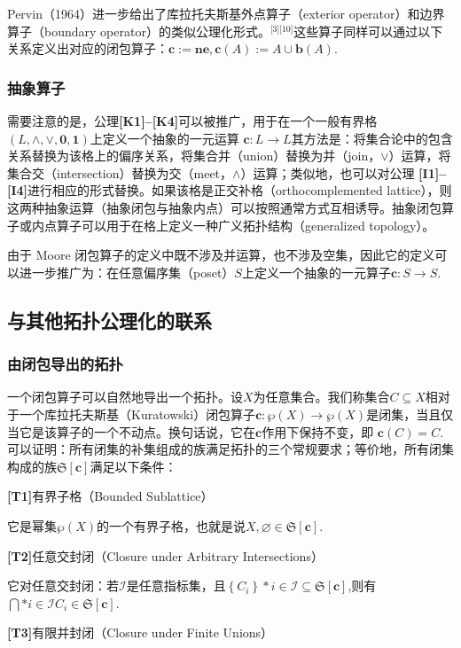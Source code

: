 Pervin（1964）进一步给出了库拉托夫斯基外点算子（exterior operator）和边界算子（boundary operator）的类似公理化形式。\(^\text{[3][10]}\)这些算子同样可以通过以下关系定义出对应的闭包算子：$\mathbf{c} := \mathbf{n e},\mathbf{c}(A) := A \cup \mathbf{b}(A)$.
\subsubsection{抽象算子}
需要注意的是，公理\textbf{[K1]–[K4]}可以被推广，用于在一个一般有界格
$(L, \land, \lor, \mathbf{0}, \mathbf{1})$上定义一个抽象的一元运算
$\mathbf{c} : L \to L$其方法是：将集合论中的包含关系替换为该格上的偏序关系，将集合并（union）替换为并（join，$\lor$）运算，将集合交（intersection）替换为交（meet，$\land$）运算；类似地，也可以对公理 \textbf{[I1]–[I4]}进行相应的形式替换。如果该格是正交补格（orthocomplemented lattice），则这两种抽象运算（抽象闭包与抽象内点）可以按照通常方式互相诱导。抽象闭包算子或内点算子可以用于在格上定义一种广义拓扑结构（generalized topology）。

由于 Moore 闭包算子的定义中既不涉及并运算，也不涉及空集，因此它的定义可以进一步推广为：在任意偏序集（poset）$S$上定义一个抽象的一元算子$\mathbf{c} : S \to S$.
\subsection{与其他拓扑公理化的联系}
\subsubsection{由闭包导出的拓扑}
一个闭包算子可以自然地导出一个拓扑。设$X$为任意集合。我们称集合$C \subseteq X$相对于一个库拉托夫斯基（Kuratowski）闭包算子$\mathbf{c} : \wp(X) \to \wp(X)$是闭集，当且仅当它是该算子的一个不动点。换句话说，它在$\mathbf{c}$作用下保持不变，即
$\mathbf{c}(C) = C$.可以证明：所有闭集的补集组成的族满足拓扑的三个常规要求；等价地，所有闭集构成的族${\mathfrak{S}}[\mathbf{c}]$满足以下条件：

\textbf{[T1]}有界子格（Bounded Sublattice）

它是幂集$\wp(X)$的一个有界子格，也就是说$X, \varnothing \in {\mathfrak{S}}[\mathbf{c}]$.

\textbf{[T2]}任意交封闭（Closure under Arbitrary Intersections）

它对任意交封闭：若$\mathcal{I}$是任意指标集，且$\left\{ C_i \right\}*{i \in \mathcal{I}} \subseteq {\mathfrak{S}}[\mathbf{c}]$,则有$\bigcap*{i \in \mathcal{I}} C_i \in {\mathfrak{S}}[\mathbf{c}]$.

\textbf{[T3]}有限并封闭（Closure under Finite Unions）

